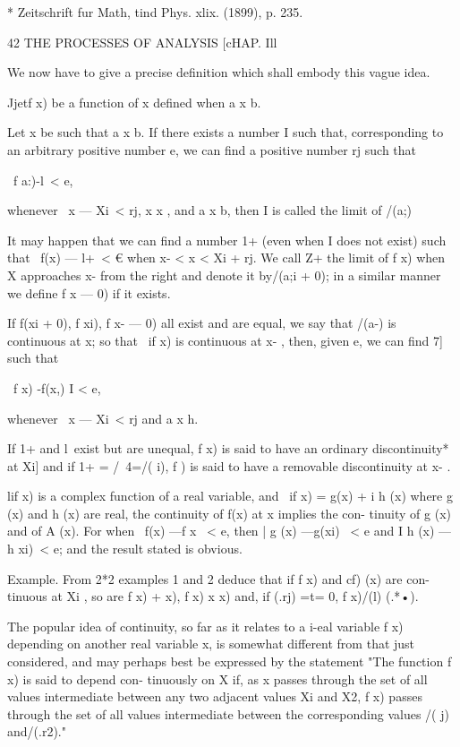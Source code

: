 * Zeitschrift fur Math, tind Phys. xlix. (1899), p. 235.



42 THE PROCESSES OF ANALYSIS [cHAP. Ill

We now have to give a precise definition which shall embody this vague
idea.

Jjetf x) be a function of x defined when a x b.

Let x be such that a x b. If there exists a number I such that,
corresponding to an arbitrary positive number e, we can find a
positive number rj such that

\ f a:)-l\ < e,

whenever \ x — Xi\ < rj, x x , and a x b, then I is called the limit
of /(a;)

It may happen that we can find a number 1+ (even when I does not
exist) such that \ f(x) — l+\ < € when x- < x < Xi + rj. We call Z+
the limit of f x) when X approaches x- from the right and denote it
by/(a;i + 0); in a similar manner we define f x — 0) if it exists.

If f(xi + 0), f xi), f x- — 0) all exist and are equal, we say that
/(a-) is continuous at x; so that \ if x) is continuous at x- , then,
given e, we can find 7] such that

\ f x) -f(x,) I < e,

whenever \ x — Xi\ < rj and a x h.

If 1+ and l\ exist but are unequal, f x) is said to have an ordinary
discontinuity* at Xi] and if 1+ = /\ 4=/( i), f ) is said to have a
removable discontinuity at x- .

lif x) is a complex function of a real variable, and \ if x) = g(x) +
i h (x) where g (x) and h (x) are real, the continuity of f(x) at x
implies the con- tinuity of g (x) and of A (x). For when \ f(x) —f x \
< e, then | g (x) —g(xi) \ < e and I h (x) — h xi)\ < e; and the
result stated is obvious.

Example. From 2*2 examples 1 and 2 deduce that if f x) and cf) (x) are
con- tinuous at Xi , so are f x) + x), f x) x x) and, if (.rj) =t= 0,
f x)/(l) (.*•).

The popular idea of continuity, so far as it relates to a i-eal
variable f x) depending on another real variable x, is somewhat
different from that just considered, and may perhaps best be expressed
by the statement "The function f x) is said to depend con- tinuously
on X if, as x passes through the set of all values intermediate
between any two adjacent values Xi and X2, f x) passes through the set
of all values intermediate between the corresponding values /( j)
and/(.r2)."

